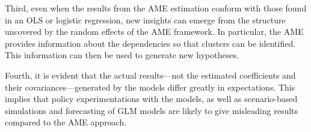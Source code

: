 Third, even when the results from the AME estimation conform with those found in an OLS or logistic regression, new insights can emerge from the structure uncovered by the random effects of the AME framework. In particular, the AME provides information about the dependencies so that clusters can be identified.  This information can then be used to generate new hypotheses. 

Fourth, it is evident that the actual results---not the estimated coefficients and their covariances---generated by the models differ greatly in expectations.  This implies that policy experimentations with the models, as well as scenario-based simulations and forecasting of GLM models are likely to give misleading results compared to the AME approach.
